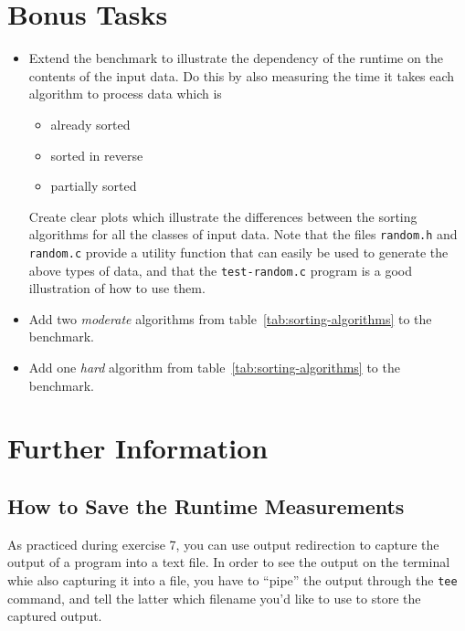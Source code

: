 \documentclass[a4paper,10pt]{article}
\begin{document}
\section{Bonus Tasks}

\begin{itemize}

\item
  Extend the benchmark to illustrate the dependency of the runtime on the contents of the input data.
  Do this by also measuring the time it takes each algorithm to process data which is
  \begin{itemize}
  \item
    already sorted
  \item
    sorted in reverse
  \item
    partially sorted
  \end{itemize}
  Create clear plots which illustrate the differences between the sorting algorithms for all the classes of input data.
  Note that the files \texttt{random.h} and \texttt{random.c} provide a utility function that can easily be used to generate the above types of data, and that the \texttt{test-random.c} program is a good illustration of how to use them.
  
\item
  Add two \emph{moderate} algorithms from table~\ref{tab:sorting-algorithms} to the benchmark.

\item
  Add one \emph{hard} algorithm from table~\ref{tab:sorting-algorithms} to the benchmark.
  
\end{itemize}



\section{Further Information}



\subsection*{How to Save the Runtime Measurements}

As practiced during exercise 7, you can use output redirection to capture the output of a program into a text file.
In order to see the output on the terminal whie also capturing it into a file, you have to ``pipe'' the output through the \texttt{tee} command, and tell the latter which filename you'd like to use to store the captured output.
\end{document}
